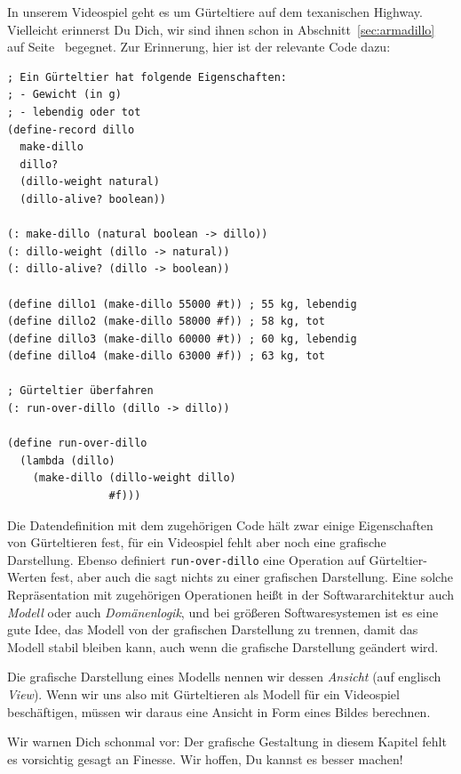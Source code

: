 %
In unserem Videospiel geht es um Gürteltiere auf dem texanischen
Highway.  Vielleicht erinnerst Du Dich, wir sind ihnen schon in
Abschnitt~\ref{sec:armadillo} auf Seite~\pageref{sec:armadillo}
begegnet.  Zur Erinnerung, hier ist der relevante Code dazu:
%
\begin{lstlisting}
; Ein Gürteltier hat folgende Eigenschaften:
; - Gewicht (in g)
; - lebendig oder tot
(define-record dillo
  make-dillo
  dillo?
  (dillo-weight natural)
  (dillo-alive? boolean))

(: make-dillo (natural boolean -> dillo))
(: dillo-weight (dillo -> natural))
(: dillo-alive? (dillo -> boolean))

(define dillo1 (make-dillo 55000 #t)) ; 55 kg, lebendig 
(define dillo2 (make-dillo 58000 #f)) ; 58 kg, tot
(define dillo3 (make-dillo 60000 #t)) ; 60 kg, lebendig
(define dillo4 (make-dillo 63000 #f)) ; 63 kg, tot

; Gürteltier überfahren
(: run-over-dillo (dillo -> dillo))

(define run-over-dillo
  (lambda (dillo)
    (make-dillo (dillo-weight dillo)
                #f)))
\end{lstlisting}
%
Die Datendefinition mit dem zugehörigen Code hält zwar einige Eigenschaften
von Gürteltieren fest, für ein Videospiel fehlt aber noch eine
grafische Darstellung.  Ebenso definiert \lstinline{run-over-dillo}
eine Operation auf Gürteltier-Werten fest, aber auch die sagt nichts
zu einer grafischen Darstellung.  Eine solche Repräsentation mit
zugehörigen Operationen heißt in der Softwararchitektur auch
\textit{Modell} oder auch
\textit{Domänenlogik}, und bei größeren Softwaresystemen
ist es eine gute Idee, das Modell von der grafischen Darstellung zu
trennen, damit das Modell stabil bleiben kann, auch wenn die grafische
Darstellung geändert wird.

Die grafische Darstellung eines Modells nennen wir dessen
\textit{Ansicht} (auf englisch
\textit{View}).  Wenn wir uns also mit Gürteltieren als
Modell für ein Videospiel beschäftigen, müssen wir daraus eine Ansicht
in Form eines Bildes berechnen.

Wir warnen Dich schonmal vor: Der grafische Gestaltung in diesem
Kapitel fehlt es vorsichtig gesagt an Finesse.  Wir hoffen, Du kannst
es besser machen!

